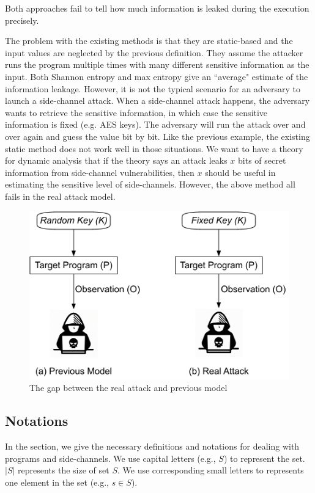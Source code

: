 Both approaches fail to tell how 
much information is leaked during the execution precisely.

The problem with the existing methods is that they are static-based and the 
input values are neglected by the previous definition. 
They assume the attacker runs the program multiple times with many different sensitive 
information as the input. Both Shannon entropy and max entropy give an ``average" 
estimate of the information leakage. However, it is not the typical scenario for an adversary to 
launch a side-channel attack. When a side-channel attack happens, the adversary wants 
to retrieve the sensitive information, in which case the sensitive information is fixed (e.g. AES keys). 
The adversary will run the attack over and over again and guess the value bit by bit. Like the 
previous example, the existing static method does not work well in those situations.
We want to have a theory for dynamic analysis that if the theory says 
an attack leaks $x$ bits of secret information from side-channel vulnerabilities,
then $x$ should be useful in estimating the sensitive level of side-channels.
However, the above method all fails in the real attack model.
\begin{figure}
  \centering
   \includegraphics[width=.9\columnwidth]{./figures/RA.pdf}
   \caption{The gap between the real attack and previous model}
\end{figure}


\subsection{Notations}
In the section, we give the necessary definitions and notations for dealing 
with programs and side-channels. We use capital letters (e.g., $S$) to represent 
the set. $|S|$ represents the size of set $S$. We use corresponding small letters
to represents one element in the set (e.g., $s \in S$).

